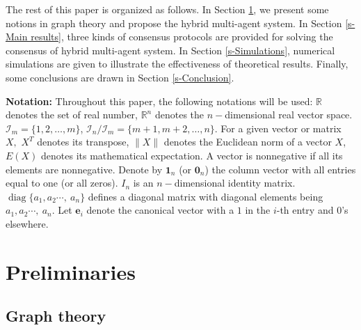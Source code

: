 \documentclass[12pt,draftcls,onecolumn]{IEEEtran}
\DeclareMathOperator{\diag}{diag}
\begin{document}
The rest of this paper is organized as follows. In Section \ref{s-preliminaries}, we present some notions in graph theory and propose the hybrid multi-agent system. In Section \ref{s-Main results}, three kinds of consensus protocols are provided for solving the consensus of hybrid multi-agent system. In Section \ref{s-Simulations}, numerical simulations are given to illustrate the effectiveness of theoretical results. Finally, some conclusions are drawn in Section \ref{s-Conclusion}.


\textbf{Notation:} Throughout this paper, the following notations will be used: $\mathbb{R}$ denotes the set of real number, $\mathbb{R}^{n}$ denotes the $n-$dimensional real vector space. $\mathcal{I}_{m}=\{1,2, \dots, m\}$, $\mathcal{I}_{n}/\mathcal{I}_{m}=\{m+1,m+2, \dots, n\}$.  For a given vector or matrix $X,$ $X^{T}$ denotes its transpose, $\|X\|$ denotes the Euclidean norm of a vector $X$, $E(X)$ denotes its mathematical expectation. A vector is nonnegative if all its elements are nonnegative. Denote by $\mathbf{1}_n$ (or $\mathbf{0}_n$) the column vector with all entries equal to one (or all zeros). $I_n$ is an $n-$dimensional identity matrix. $\diag\{a_{1},a_{2} \cdots,\ a_{n}\}$ defines a diagonal matrix with diagonal elements being $a_{1}, a_{2} \cdots,\ a_{n}$. Let $\mathbf{e}_i$ denote the canonical vector with a $1$ in the $i$-th entry and 0's elsewhere.

\section{Preliminaries}\label{s-preliminaries}

\subsection{Graph theory}\label{s-graph theory}
\end{document}
